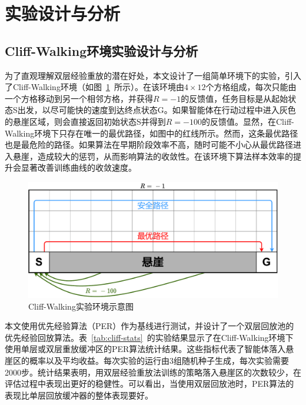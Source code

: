 \section{实验设计与分析}

\subsection{Cliff-Walking环境实验设计与分析}


为了直观理解双层经验重放的潜在好处，本文设计了一组简单环境下的实验，引入了Cliff-Walking环境（如图~\ref{fig:cliff-env}~所示）。在该环境由$4\times 12$个方格组成，每次只能由一个方格移动到另一个相邻方格，并获得$R=-1$的反馈值，任务目标是从起始状态S出发，以尽可能快的速度到达终点状态G。如果智能体在行动过程中进入灰色的悬崖区域，则会直接返回初始状态S并得到$R=-100$的反馈值。显然，在Cliff-Walking环境下只存在唯一的最优路径，如图中的红线所示。然而，这条最优路径也是最危险的路径。如果算法在早期阶段效率不高，随时可能不小心从最优路径进入悬崖，造成较大的惩罚，从而影响算法的收敛性。在该环境下算法样本效率的提升会显著改善训练曲线的收敛速度。

\begin{figure}[ht]
\centering
\includegraphics[width=\textwidth]{figures/cliff-env.pdf}
\caption{Cliff-Walking实验环境示意图}
\label{fig:cliff-env}
\end{figure}

本文使用优先经验算法（PER）作为基线进行测试，并设计了一个双层回放池的优先经验回放算法。表~\ref{tab:cliff-stats}~的实验结果显示了在Cliff-Walking环境下使用单层或双层重放缓冲区的PER算法统计结果。这些指标代表了智能体落入悬崖区的概率以及平均收益。每次实验的运行由3组随机种子生成，每次实验需要2000步。统计结果表明，用双层经验重放法训练的策略落入悬崖区的次数较少，在评估过程中表现出更好的稳健性。可以看出，当使用双层回放池时，PER算法的表现比单层回放缓冲器的整体表现要好。

